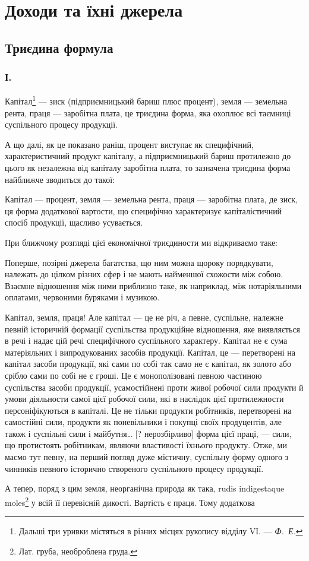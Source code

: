 
\chapter{Доходи та їхні джерела}

\section{Триєдина формула}

\subsection*{І.}

Капітал\footnote{Дальші три уривки містяться в різних місцях рукопису відділу VІ. — \emph{Ф.~Е.}}
— зиск (підприємницький бариш плюс процент), земля — земельна
рента, праця — заробітна плата, це триєдина форма, яка охоплює всі таємниці
суспільного процесу продукції.

А що далі, як це показано раніш, процент виступає як специфічний,
характеристичний продукт капіталу, а підприємницький бариш протилежно
до цього як незалежна від капіталу заробітна плата, то зазначена триєдина
форма найближче зводиться до такої:

Капітал — процент, земля — земельна рента, праця — заробітна плата, де зиск,
ця форма додаткової вартости, що специфічно характеризує капіталістичний спосіб
продукції, щасливо усувається.

При ближчому розгляді цієї економічної триєдиности ми відкриваємо таке:

Поперше, позірні джерела багатства, що ним можна щороку порядкувати,
належать до цілком різних сфер і не мають найменшої схожости між собою.
Взаємне відношення між ними приблизно таке, як наприклад, між нотаріяльними
оплатами, червоними буряками і музикою.

Капітал, земля, праця! Але капітал — це не річ, а певне, суспільне,
належне певній історичній формації суспільства продукційне відношення, яке
виявляється в речі і надає цій речі специфічного суспільного характеру. Капітал
не є сума матеріяльних і випродукованих засобів продукції. Капітал, це —
перетворені на капітал засоби продукції, які сами по собі так само не є капітал,
як золото або срібло сами по собі не є гроші. Це є монополізовані певною
частиною суспільства засоби продукції, усамостійнені проти живої робочої сили
продукти й умови діяльности самої цієї робочої сили, які в наслідок цієї протилежности
персоніфікуються в капіталі. Це не тільки продукти робітників,
перетворені на самостійні сили, продукти як поневільники і покупці своїх продуцентів,
але також і суспільні сили і майбутня\dots{} [? нерозбірливо] форма цієї
праці, — сили, що протистоять робітникам, являючи властивості їхнього продукту.
Отже, ми маємо тут певну, на перший погляд дуже містичну, суспільну форму
одного з чинників певного історично створеного суспільного процесу продукції.

\disablefootnotebreak{}
А тепер, поряд з цим земля, неорганічна природа як така, rudis indigestaque
moles\footnote*{
Лат. груба, необроблена груда. 
} у всій її перевісній дикості. Вартість є праця. Тому додаткова
\parbreak{}  %
